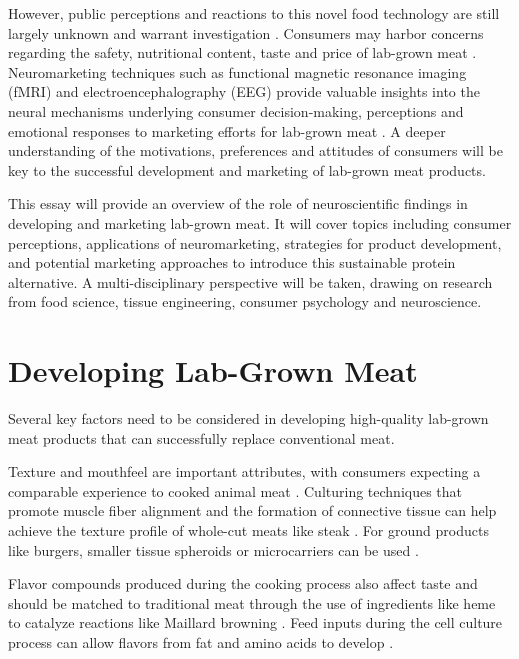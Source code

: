 \documentclass[10pt]{article}
\begin{document}
\begin{sloppypar}
  However, public perceptions and reactions to this novel food technology are still largely unknown and warrant investigation \citep{verbeke_would_2015}. Consumers may harbor concerns regarding the safety, nutritional content, taste and price of lab-grown meat \citep{bryant_consumer_2018}. Neuromarketing techniques such as functional magnetic resonance imaging (fMRI) and electroencephalography (EEG) provide valuable insights into the neural mechanisms underlying consumer decision-making, perceptions and emotional responses to marketing efforts for lab-grown meat \citep{al-kwifi_dynamics_2019}. A deeper understanding of the motivations, preferences and attitudes of consumers will be key to the successful development and marketing of lab-grown meat products.

  This essay will provide an overview of the role of neuroscientific findings in developing and marketing lab-grown meat. It will cover topics including consumer perceptions, applications of neuromarketing, strategies for product development, and potential marketing approaches to introduce this sustainable protein alternative. A multi-disciplinary perspective will be taken, drawing on research from food science, tissue engineering, consumer psychology and neuroscience.

  \section{Developing Lab-Grown Meat  }
  \label{sec:developing-lab-grown-meat}

  Several key factors need to be considered in developing high-quality lab-grown meat products that can successfully replace conventional meat.

  Texture and mouthfeel are important attributes, with consumers expecting a comparable experience to cooked animal meat \citep{datar_possibilities_2010}. Culturing techniques that promote muscle fiber alignment and the formation of connective tissue can help achieve the texture profile of whole-cut meats like steak \citep{post_cultured_2012}. For ground products like burgers, smaller tissue spheroids or microcarriers can be used \citep{specht_opportunities_2018}.

  Flavor compounds produced during the cooking process also affect taste and should be matched to traditional meat through the use of ingredients like heme to catalyze reactions like Maillard browning \citep{post_cultured_2012}. Feed inputs during the cell culture process can allow flavors from fat and amino acids to develop \citep{kumar_-vitro_2021}.


\end{sloppypar}
\end{document}
